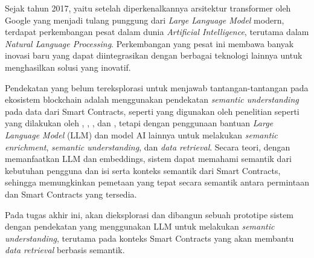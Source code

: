 Sejak tahun 2017, yaitu setelah diperkenalkannya arsitektur transformer oleh Google yang menjadi tulang punggung dari \textit{Large Language Model} modern, terdapat perkembangan pesat dalam dunia \textit{Artificial Intelligence}, terutama dalam \textit{Natural Language Processing}. Perkembangan yang pesat ini membawa banyak inovasi baru yang dapat diintegrasikan dengan berbagai teknologi lainnya untuk menghasilkan solusi yang inovatif.

Pendekatan yang belum tereksplorasi untuk menjawab tantangan-tantangan pada ekosistem blockchain adalah menggunakan pendekatan \textit{semantic understanding} pada data dari Smart Contracts, seperti yang digunakan oleh penelitian seperti yang dilakukan oleh \cite{third2017linked}, \cite{shi2021semantic}, \cite{stan}, dan \cite{sopek2018graphchain}, tetapi dengan penggunaan bantuan \textit{Large Language Model} (LLM) dan model AI lainnya untuk melakukan \textit{semantic enrichment}, \textit{semantic understanding}, dan \textit{data retrieval}. Secara teori, dengan memanfaatkan LLM dan embeddings, sistem dapat memahami semantik dari kebutuhan pengguna dan isi serta konteks semantik dari Smart Contracts, sehingga memungkinkan pemetaan yang tepat secara semantik antara permintaan dan Smart Contracts yang tersedia.


Pada tugas akhir ini, akan dieksplorasi dan dibangun sebuah prototipe sistem dengan pendekatan yang menggunakan LLM untuk melakukan \textit{semantic understanding}, terutama pada konteks Smart Contracts yang akan membantu \textit{data retrieval} berbasis semantik.



